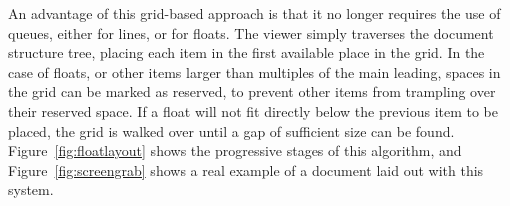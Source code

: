 An advantage of this grid-based approach is that it no longer requires the use of queues, either for lines, or for floats. The viewer simply traverses the document structure tree, placing each item in the first available place in the grid. In the case of floats, or other items larger than multiples of the main \gls{leading}, spaces in the grid can be marked as reserved, to prevent other items from trampling over their reserved space. If a float will not fit directly below the previous item to be placed, the grid is walked over until a gap of sufficient size can be found. Figure~\ref{fig:floatlayout} shows the progressive stages of this algorithm, and Figure~\ref{fig:screengrab} shows a real example of a document laid out with this system.

\begin{figure}
    \captionsetup[subfigure]{justification=raggedright}
    \hspace{0.04\textwidth}
    \hspace{0.04\textwidth}
    \\

\end{figure}
